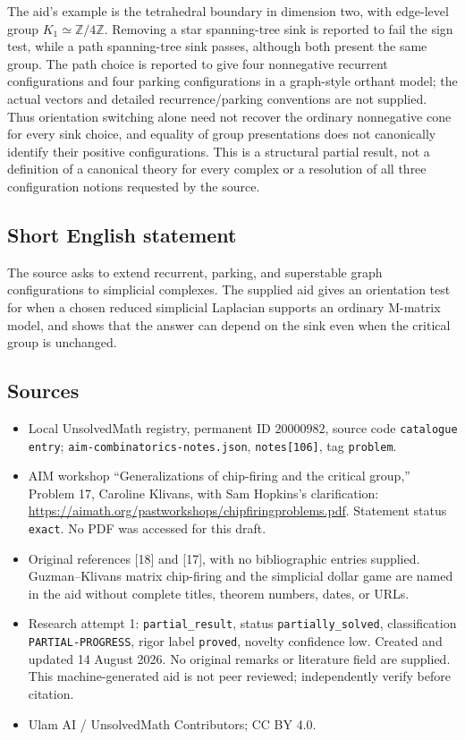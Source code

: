 \documentclass[11pt]{article}
\newcommand{\Z}{\mathbb{Z}}
\begin{document}
The aid's example is the tetrahedral boundary in dimension two, with edge-level group \(K_1\simeq\Z/4\Z\). Removing a star spanning-tree sink is reported to fail the sign test, while a path spanning-tree sink passes, although both present the same group. The path choice is reported to give four nonnegative recurrent configurations and four parking configurations in a graph-style orthant model; the actual vectors and detailed recurrence/parking conventions are not supplied. Thus orientation switching alone need not recover the ordinary nonnegative cone for every sink choice, and equality of group presentations does not canonically identify their positive configurations. This is a structural partial result, not a definition of a canonical theory for every complex or a resolution of all three configuration notions requested by the source.
\subsection{Short English statement}
The source asks to extend recurrent, parking, and superstable graph configurations to simplicial complexes. The supplied aid gives an orientation test for when a chosen reduced simplicial Laplacian supports an ordinary M-matrix model, and shows that the answer can depend on the sink even when the critical group is unchanged.
\subsection{Sources}
\begin{itemize}
\item Local UnsolvedMath registry, permanent ID \(20000982\), source code \texttt{catalogue entry}; \texttt{aim-combinatorics-notes.json}, \texttt{notes[106]}, tag \texttt{problem}.
\item AIM workshop ``Generalizations of chip-firing and the critical group,'' Problem 17, Caroline Klivans, with Sam Hopkins's clarification: \url{https://aimath.org/pastworkshops/chipfiringproblems.pdf}. Statement status \texttt{exact}. No PDF was accessed for this draft.
\item Original references [18] and [17], with no bibliographic entries supplied. Guzman--Klivans matrix chip-firing and the simplicial dollar game are named in the aid without complete titles, theorem numbers, dates, or URLs.
\item Research attempt 1: \texttt{partial\_result}, status \texttt{partially\_solved}, classification \texttt{PARTIAL-PROGRESS}, rigor label \texttt{proved}, novelty confidence low. Created and updated 14 August 2026. No original remarks or literature field are supplied. This machine-generated aid is not peer reviewed; independently verify before citation.
\item Ulam AI / UnsolvedMath Contributors; CC BY 4.0.
\end{itemize}
\end{document}
